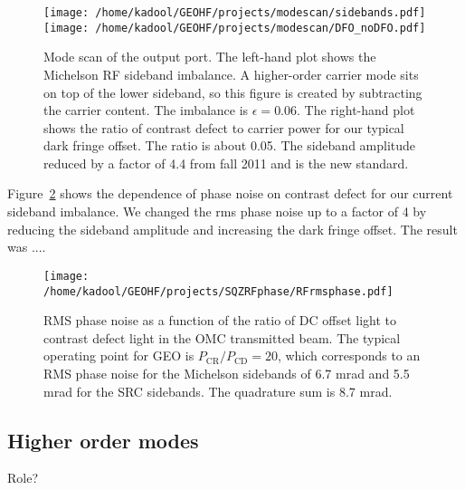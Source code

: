 \documentclass{ligodoc}
\begin{document}
\begin{figure}
\begin{centering}
\texttt{[image: /home/kadool/GEOHF/projects/modescan/sidebands.pdf]}\texttt{[image: /home/kadool/GEOHF/projects/modescan/DFO\_noDFO.pdf]}
\caption{Mode scan of the output port. The left-hand plot shows the
  Michelson RF sideband imbalance. A higher-order carrier mode sits on
  top of the lower sideband, so this figure is created by subtracting
  the carrier content. The imbalance is $\epsilon = 0.06$. The
  right-hand plot shows the ratio of contrast defect to carrier power
  for our typical dark fringe offset. The ratio is about 0.05. The
  sideband amplitude reduced by a factor of 4.4 from fall 2011 and is
  the new standard.}
\label{fig:modescan}
\end{centering}
\end{figure}

Figure~\ref{fig:phirms} shows the dependence of phase noise on
contrast defect for our current sideband imbalance. We changed the rms
phase noise up to a factor of 4 by reducing the sideband amplitude and
increasing the dark fringe offset. The result was .... %


\begin{figure}
\begin{centering}
\texttt{[image: /home/kadool/GEOHF/projects/SQZRFphase/RFrmsphase.pdf]}
\caption{RMS phase noise as a function of the ratio of DC offset light
  to contrast defect light in the OMC transmitted beam. The typical
  operating point for GEO is $P_{\mathrm{CR}}/P_{\mathrm{CD}}=20$,
  which corresponds to an RMS phase noise for the Michelson sidebands
  of 6.7 mrad and 5.5 mrad for the SRC sidebands. The quadrature sum
  is 8.7 mrad.}
\label{fig:phirms}
\end{centering}
\end{figure}



\subsection{Higher order modes}
Role?

\end{document}
